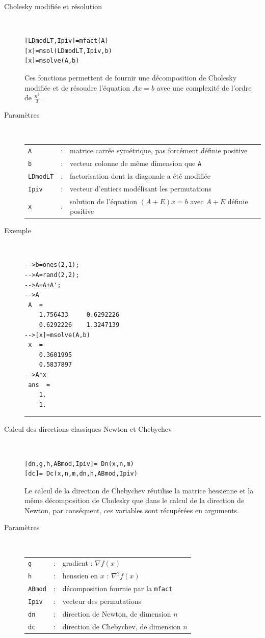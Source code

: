 \begin{description}
  \item[Cholesky modifiée et résolution] \hfill \\

\begin{verbatim} 
[LDmodLT,Ipiv]=mfact(A)
[x]=msol(LDmodLT,Ipiv,b)
[x]=msolve(A,b)
\end{verbatim}

Ces fonctions permettent de fournir une décomposition de Cholesky modifiée et de résoudre l'équation $Ax=b$ 
avec une complexité de l'ordre de $\frac{n^3}{3}$.

  \item[Paramètres] \hfill \\
\begin{tabular}{lll}
{\tt A}&:& matrice carrée symétrique, pas forcément définie positive\\
{\tt b}&:& vecteur colonne de même dimension que {\tt A} \\
{\tt LDmodLT}&:& factorisation dont la diagonale a été modifiée\\
{\tt Ipiv}&:& vecteur d'entiers modélisant les permutations\\
{\tt x}&:& solution de l'équation $(A+E)x=b$ avec $A+E$ définie positive\\
\end{tabular}

  \item[Exemple] \hfill \\
\begin{verbatim}
-->b=ones(2,1);
-->A=rand(2,2);
-->A=A+A';
-->A
 A  =
    1.756433     0.6292226  
    0.6292226    1.3247139  
-->[x]=msolve(A,b)
 x  =
    0.3601995  
    0.5837897  
-->A*x
 ans  =
    1.  
    1.  
\end{verbatim}
\rule{\linewidth}{1pt}
  \item[Calcul des directions classiques Newton et Chebychev] \hfill \\
\begin{verbatim} 
[dn,g,h,ABmod,Ipiv]= Dn(x,n,m)
[dc]= Dc(x,n,m,dn,h,ABmod,Ipiv)
\end{verbatim}
Le calcul de la direction de Chebychev réutilise la matrice hessienne et la même décomposition de Cholesky que dans 
le calcul de la direction de Newton, par conséquent, ces variables sont récupérées en arguments.


  \item[Paramètres] \hfill \\
\begin{tabular}{lll}
{\tt g}&:& gradient : $\nabla f(x)$\\
{\tt h}&:& henssien en $x$ : $\nabla^2f(x)$\\
{\tt ABmod}&:& décomposition fournie par la {\tt mfact}\\
{\tt Ipiv}&:& vecteur des permutations\\
{\tt dn}&:& direction de Newton, de dimension $n$\\
{\tt dc}&:& direction de Chebychev, de dimension $n$\\
\end{tabular}
\end{description}

